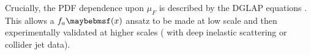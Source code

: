 Crucially, the \ac{PDF} dependence upon $\mu_F$ is described by the DGLAP equations 
\cite{Gribov:1972,Altarelli:1977,Dokshitser:1977}. This allows a $f_a \parenths{x}$ 
ansatz to be made at low scale and then experimentally validated at higher scales (\eg 
with deep inelastic scattering or collider jet data).
